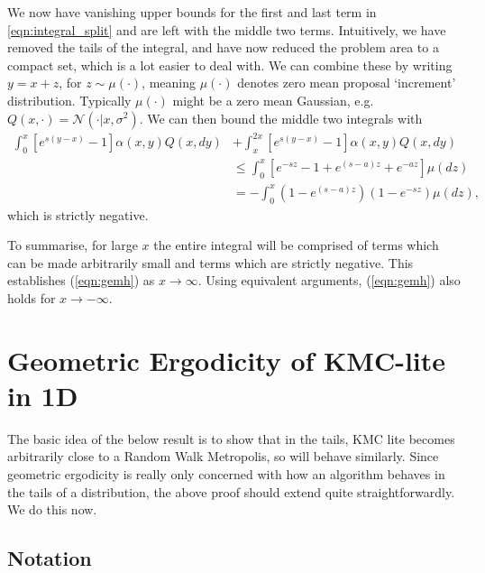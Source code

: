 \documentclass{article}
\begin{document}
We now have vanishing upper bounds for the first and last term in \eqref{eqn:integral_split} and are left with the middle two terms.  Intuitively, we have removed the tails of the integral, and have now reduced the problem area to a compact set, which is a lot easier to deal with.  We can combine these by writing $y = x + z$, for $z \sim \mu(\cdot)$, meaning $\mu(\cdot)$ denotes zero mean proposal `increment' distribution.  Typically $\mu(\cdot)$ might be a zero mean Gaussian, e.g.\ $Q(x,\cdot) = \mathcal{N}(\cdot|x,\sigma^2)$.  We can then bound the middle two integrals with
\begin{align} \label{eqn:rwm}
\int_0^x [e^{s(y-x)} - 1]\alpha(x,y)Q(x,dy) &+ \int_x^{2x} [e^{s(y-x)} - 1]\alpha(x,y)Q(x,dy)\\
&\leq \int_0^x [e^{-sz} - 1 + e^{(s-a)z} + e^{-az}]\mu(dz) \nonumber \\
&= -\int_0^{x} (1-e^{(s-a)z})(1-e^{-sz}) \mu(dz), \nonumber
\end{align}
which is strictly negative.

To summarise, for large $x$ the entire integral will be comprised of terms which can be made arbitrarily small and terms which are strictly negative. This establishes (\ref{eqn:gemh}) as $x \to \infty$. Using equivalent arguments, (\ref{eqn:gemh}) also holds for $x \to -\infty$.

\section{Geometric Ergodicity of KMC-lite in 1D}

The basic idea of the below result is to show that in the tails, KMC lite becomes arbitrarily close to a Random Walk Metropolis, so will behave similarly.  Since geometric ergodicity is really only concerned with how an algorithm behaves in the tails of a distribution, the above proof should extend quite straightforwardly.  We do this now.

\subsection{Notation}
\end{document}
